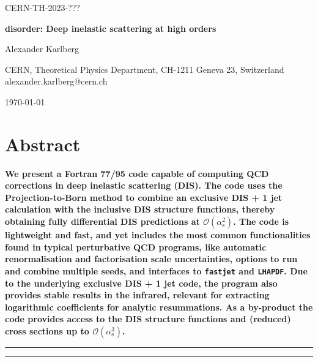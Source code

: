 \documentclass[submission, PhysCodeb]{SciPost}
\newcommand{\as}{\alpha_{\mathrm{s}}}
\begin{document}
\begin{flushright}
CERN-TH-2023-???
\end{flushright}
\begin{center}{\Large \textbf{
disorder: Deep inelastic scattering at high orders\\
}}\end{center}

\begin{center}
Alexander Karlberg
\end{center}

\begin{center}
CERN, Theoretical Physics Department, CH-1211 Geneva 23, Switzerland
\\
{\small \sf alexander.karlberg@cern.ch}
\end{center}

\begin{center}
\today
\end{center}


\section*{Abstract}
{\bf
We present a Fortran 77/95 code capable of computing QCD corrections
in deep inelastic scattering (DIS). The code uses the
Projection-to-Born method to combine an exclusive DIS + 1 jet
calculation with the inclusive DIS structure functions, thereby
obtaining fully differential DIS predictions at
$\mathcal{O}(\as^2)$. The code is lightweight and fast, and yet
includes the most common functionalities found in typical perturbative
QCD programs, like automatic renormalisation and factorisation scale
uncertainties, options to run and combine multiple seeds, and
interfaces to {\tt fastjet} and {\tt LHAPDF}. Due to the underlying
exclusive DIS + 1 jet code, the program also provides stable results
in the infrared, relevant for extracting logarithmic coefficients for
analytic resummations. As a by-product the code provides access
to the DIS structure functions and (reduced) cross sections up to
$\mathcal{O}(\as^3)$.}


\vspace{10pt}
\noindent\rule{\textwidth}{1pt}
\tableofcontents\thispagestyle{fancy}
\noindent\rule{\textwidth}{1pt}
\vspace{10pt}
\newpage
\end{document}
